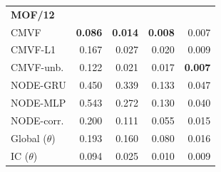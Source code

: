 \begin{tabular*}{\linewidth}{@{\extracolsep{\fill}}lrrrr}
\midrule
\multicolumn{5}{l}{\textbf{MOF/12}} \\
CMVF & \textbf{0.086} & \textbf{0.014} & \textbf{0.008} & 0.007 \\
CMVF-L1 & 0.167 & 0.027 & 0.020 & 0.009 \\
CMVF-unb. & 0.122 & 0.021 & 0.017 & \textbf{0.007} \\
NODE-GRU & 0.450 & 0.339 & 0.133 & 0.047 \\
NODE-MLP & 0.543 & 0.272 & 0.130 & 0.040 \\
NODE-corr. & 0.200 & 0.111 & 0.055 & 0.015 \\
Global ($\theta$) & 0.193 & 0.160 & 0.080 & 0.016 \\
IC ($\theta$) & 0.094 & 0.025 & 0.010 & 0.009 \\
\bottomrule
\end{tabular*}
